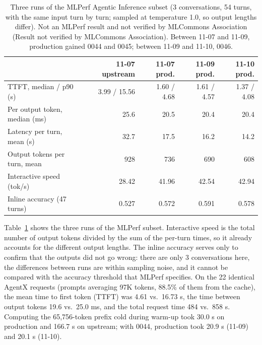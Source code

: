 \documentclass[11pt,a4paper]{article}
\newcommand{\tps}{tok/s}
\begin{document}
\begin{table}[h]
  \centering
  \small
  \caption{Three runs of the MLPerf Agentic Inference subset (3 conversations, 54 turns, with the same input turn by turn; sampled at temperature 1.0, so output lengths differ). Not an MLPerf result and not verified by MLCommons Association (Result not verified by MLCommons Association). Between 11-07 and 11-09, production gained 0044 and 0045; between 11-09 and 11-10, 0046.}
  \label{tab:mlperf}
  \begin{tabular}{@{}l r r r r@{}}
    \toprule
     & 11-07 upstream & 11-07 prod. & 11-09 prod. & 11-10 prod. \\
    \midrule
    TTFT, median / p90 (s) & 3.99 / 15.56 & 1.60 / 4.68 & 1.61 / 4.57 & 1.37 / 4.08 \\
    Per output token, median (ms) & 25.6 & 20.5 & 20.4 & 20.4 \\
    Latency per turn, mean (s) & 32.7 & 17.5 & 16.2 & 14.2 \\
    Output tokens per turn, mean & 928 & 736 & 690 & 608 \\
    Interactive speed (\tps{}) & 28.42 & 41.96 & 42.54 & 42.94 \\
    Inline accuracy (47 turns) & 0.527 & 0.572 & 0.591 & 0.578 \\
    \bottomrule
  \end{tabular}
\end{table}

Table~\ref{tab:mlperf} shows the three runs of the MLPerf subset. Interactive speed is the total number of output tokens divided by the sum of the per-turn times, so it already accounts for the different output lengths. The inline accuracy serves only to confirm that the outputs did not go wrong: there are only 3 conversations here, the differences between runs are within sampling noise, and it cannot be compared with the accuracy threshold that MLPerf specifies. On the 22 identical AgentX requests (prompts averaging 97K tokens, 88.5\% of them from the cache), the mean time to first token (TTFT) was 4.61 vs.\ 16.73 s, the time between output tokens 19.6 vs.\ 25.0 ms, and the total request time 484 vs.\ 858 s. Computing the 65,756-token prefix cold during warm-up took 30.0 s on production and 166.7 s on upstream; with 0044, production took 20.9 s (11-09) and 20.1 s (11-10).
\end{document}
